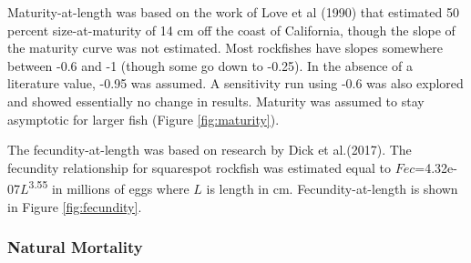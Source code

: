 \documentclass[11pt,
  english,
  a4paper,
]{article}
\begin{document}
\leavevmode\tagmcend\tagstructend


Maturity-at-length was based on the work of Love et al {(1990)\leavevmode\tagmcend\tagstructend} that estimated 50 percent size-at-maturity of 14 cm off the coast of California, though the slope of the maturity curve was not estimated. Most rockfishes have slopes somewhere between -0.6 and -1 (though some go down to -0.25). In the absence of a literature value, -0.95 was assumed. A sensitivity run using -0.6 was also explored and showed essentially no change in results. Maturity was assumed to stay asymptotic for larger fish (Figure \ref{fig:maturity}).

\leavevmode\tagmcend\tagstructend\par


The fecundity-at-length was based on research by Dick et al.{(2017)\leavevmode\tagmcend\tagstructend}. The fecundity relationship for squarespot rockfish was estimated equal to {\(Fec\)\leavevmode\tagmcend\tagstructend}=4.32e-07{\(L\)\leavevmode\tagmcend\tagstructend}\textsuperscript{3.55} in millions of eggs where {\(L\)\leavevmode\tagmcend\tagstructend} is length in cm. Fecundity-at-length is shown in Figure \ref{fig:fecundity}.

\leavevmode\tagmcend\tagstructend\par


\hypertarget{natural-mortality}{%
\subsubsection{Natural Mortality}\label{natural-mortality}}

\leavevmode\tagmcend\tagstructend

\end{document}
